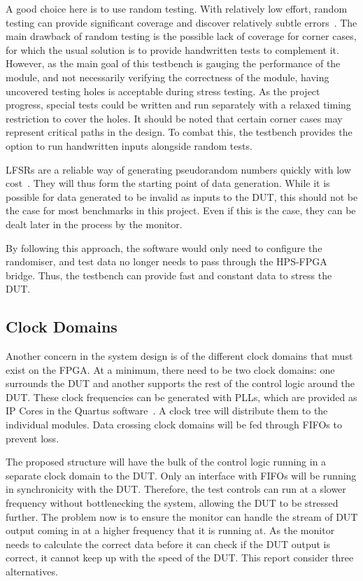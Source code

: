 A good choice here is to use random testing.
With relatively low effort, random testing can provide significant coverage
and discover relatively subtle errors~\cite{Duran1}.
The main drawback of random testing is the possible lack of coverage for corner
cases, for which the usual solution is to provide handwritten tests to
complement it.
However, as the main goal of this testbench is gauging the performance of
the module, and not necessarily verifying the correctness of the module,
having uncovered testing holes is acceptable during stress testing.
As the project progress, special tests could be written and run separately
with a relaxed timing restriction to cover the holes.
It should be noted that certain corner cases may represent critical paths in
the design.
To combat this, the testbench provides the option to run handwritten inputs
alongside random tests.

LFSRs are a reliable way of generating pseudorandom numbers quickly with low
cost~\cite{Hazwani1}.
They will thus form the starting point of data generation.
While it is possible for data generated to be invalid as inputs to the DUT, this
should not be the case for most benchmarks in this project.
Even if this is the case, they can be dealt later in the process by the monitor.

By following this approach, the software would only need to configure the
randomiser, and test data no longer needs to pass through the HPS-FPGA bridge.
Thus, the testbench can provide fast and constant data to stress the DUT.

\subsection{Clock Domains}
Another concern in the system design is of the different clock domains that
must exist on the FPGA.
At a minimum, there need to be two clock domains: one surrounds the DUT and
another supports the rest of the control logic around the DUT.
These clock frequencies can be generated with PLLs, which are
provided as IP Cores in the Quartus software~\cite{Altera4}.
A clock tree will distribute them to the individual modules.
Data crossing clock domains will be fed through FIFOs to prevent loss.

The proposed structure will have the bulk of the control logic running
in a separate clock domain to the DUT.
Only an interface with FIFOs will be running in synchronicity
with the DUT.
Therefore, the test controls can run at a slower frequency without
bottlenecking the system, allowing the DUT to be stressed further.
The problem now is to ensure the monitor can handle the stream of DUT output
coming in at a higher frequency that it is running at.
As the monitor needs to calculate the correct data before it can check if the
DUT output is correct, it cannot keep up with the speed of the DUT.
This report consider three alternatives.

